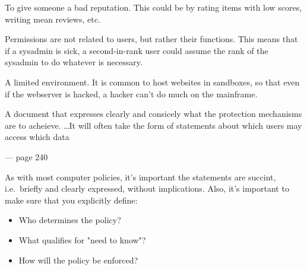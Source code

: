 \begin{definition}
	To give someone a bad reputation. This could be by rating items
	with low scores, writing mean reviews, etc.
\end{definition}

\begin{definition}
	Permissions are not related to users, but rather their functions. 
	This means that if a sysadmin is sick, a second-in-rank user could
	assume the rank of the sysadmin to do whatever is necessary.
\end{definition}

\begin{definition}[Sandbox]
	A limited environment. It is common to host websites in sandboxes,
	so that even if the webserver is hacked, a hacker can't do much on the
	mainframe.
\end{definition}


\begin{definition}\label{secpol}
\end{definition}



\begin{definition}[Secrecy]
\end{definition}

\begin{definition}

\end{definition}

\begin{definition}\label{secfunreq}
	
\end{definition}

	\epigraph{A document that expresses clearly and consicely what the 
	protection mechanisms are to acheieve. \dots It will often take the form of 
	statements about which users may access which data}{--- page 240}

	As with most computer policies, it's important the statements
	are succint, i.e.\ briefly and clearly expressed, without implications. 
	Also, it's important to make sure that you explicitly define:
	\begin{itemize}
		\item Who determines the policy?
		\item What qualifies for "need to know"?
		\item How will the policy be enforced?
	\end{itemize}

